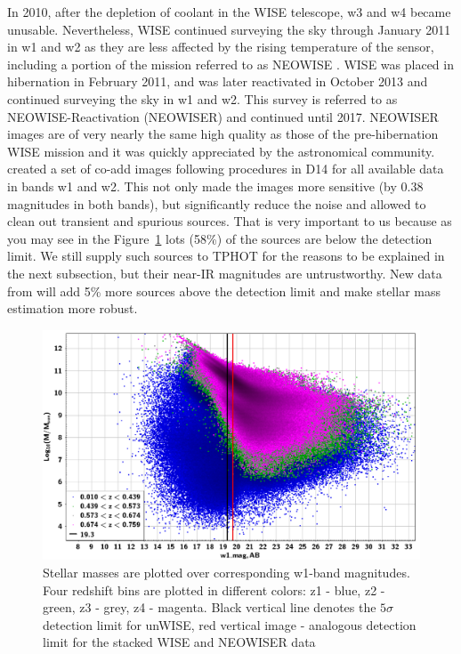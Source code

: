 In 2010, after the depletion of coolant in the WISE telescope, w3 and w4 became unusable. Nevertheless, WISE continued surveying the sky through January 2011 in w1 and w2 as they are less affected by the rising temperature of the sensor, including a portion of the mission referred to as NEOWISE \citep{2011ApJ...731...53M}. WISE was placed in hibernation in February 2011, and was later reactivated in October 2013 and continued surveying the sky in w1 and w2. This survey is referred to as NEOWISE-Reactivation (NEOWISER) and continued until 2017. NEOWISER images are of very nearly the same high quality as those of the pre-hibernation WISE mission and it was quickly appreciated by the astronomical community. \citep{1538-3881-154-4-161} created a set of co-add images following procedures in D14 for all available data in bands w1 and w2. This not only made the images more sensitive (by 0.38 magnitudes in both bands), but significantly reduce the noise and allowed to clean out transient and spurious sources. That is very important to us because as you may see in the Figure~\ref{fig:sm_w1-mag} lots (58\%) of the sources are below the detection limit. We still supply such sources to TPHOT for the reasons to be explained in the next subsection, but their near-IR magnitudes are untrustworthy. New data from \citep{1538-3881-154-4-161} will add 5\% more sources above the detection limit and make stellar mass estimation more robust.

\begin{figure}[!ht]
\includegraphics[width=6in]{Figures/mass_vs_w1-mag.png}
\caption{Stellar masses are plotted over corresponding w1-band magnitudes. Four redshift bins are plotted in different colors: z1 - blue, z2 - green, z3 - grey, z4 - magenta. Black vertical line denotes the $5\sigma$ detection limit for unWISE, red vertical image - analogous detection limit for the stacked WISE and NEOWISER data}
\label{fig:sm_w1-mag}
\end{figure}

